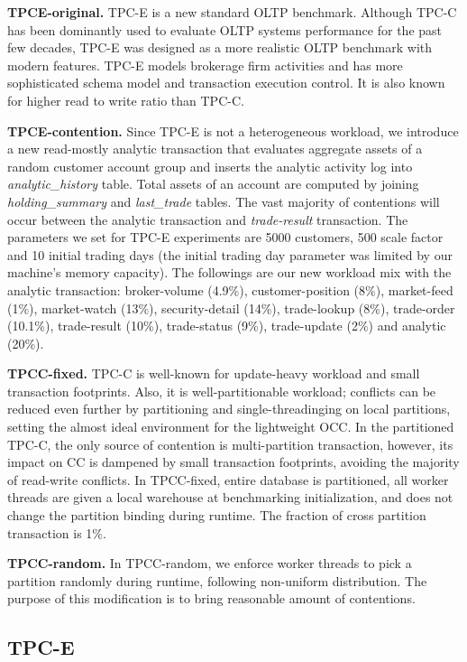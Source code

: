 \textbf{TPCE-original.}
TPC-E is a new standard OLTP benchmark. Although TPC-C has been dominantly used to evaluate OLTP systems performance for the past few decades, TPC-E was designed as a more realistic OLTP benchmark with modern features. TPC-E models brokerage firm activities and has more sophisticated schema model and transaction execution control\cite{TPCE}. It is also known for higher read to write ratio than TPC-C.


\textbf{TPCE-contention.}
Since TPC-E is not a heterogeneous workload, we introduce a new read-mostly analytic transaction that evaluates aggregate assets of a random customer account group and inserts the analytic activity log into \textit{analytic\_history} table. Total assets of an account are computed by joining \textit{holding\_summary} and \textit{last\_trade} tables. The vast majority of contentions will occur between the analytic transaction and \textit{trade-result} transaction. The parameters we set for TPC-E experiments are 5000 customers, 500 scale factor and 10 initial trading days (the initial trading day parameter was limited by our machine's memory capacity). The followings are our new workload mix with the analytic transaction: broker-volume (4.9\%), customer-position (8\%), market-feed (1\%), market-watch (13\%), security-detail (14\%), trade-lookup (8\%), trade-order (10.1\%), trade-result (10\%), trade-status (9\%), trade-update (2\%) and analytic (20\%). 


\textbf{TPCC-fixed.}
TPC-C is well-known for update-heavy workload and small transaction footprints. Also, it is well-partitionable workload; conflicts can be reduced even further by partitioning and single-threadinging on local partitions, setting the almost ideal environment for the lightweight OCC. In the partitioned TPC-C, the only source of contention is multi-partition transaction, however, its impact on CC is dampened by small transaction footprints, avoiding the majority of read-write conflicts. In TPCC-fixed, entire database is partitioned, all worker threads are given a local warehouse at benchmarking initialization, and does not change the partition binding during runtime. The fraction of cross partition transaction is 1\%. 


\textbf{TPCC-random.}
In TPCC-random, we enforce worker threads to pick a partition randomly during runtime, following non-uniform distribution. The purpose of this modification is to bring reasonable amount of contentions.  

\subsection{TPC-E}


